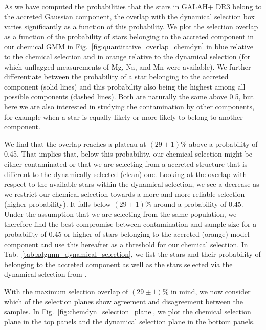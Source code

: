 \documentclass[fleqn,usenatbib]{mnras}
\begin{document}

As we have computed the probabilities that the stars in GALAH+ DR3 belong to the accreted Gaussian component, the overlap with the dynamical selection box varies significantly as a function of this probability. We plot the selection overlap as a function of the probability of stars belonging to the accreted component in our chemical GMM in Fig.~\ref{fig:quantitative_overlap_chemdyn} in blue relative to the chemical selection and in orange relative to the dynamical selection (for which unflagged measurements of Mg, Na, and Mn were available). We further differentiate between the probability of a star belonging to the accreted component (solid lines) and this probability also being the highest among all possible components (dashed lines). Both are naturally the same above 0.5, but here we are also interested in studying the contamination by other components, for example when a star is equally likely or more likely to belong to another component. 

We find that the overlap reaches a plateau at $(29\pm1)\%$ above a probability of 0.45. That implies that, below this probability, our chemical selection might be either contaminated or that we are selecting from a accreted structure that is different to the dynamically selected (clean) one. Looking at the overlap with respect to the available stars within the dynamical selection, we see a decrease as we restrict our chemical selection towards a more and more reliable selection (higher probability). It falls below $(29\pm1)\%$ around a probability of 0.45. Under the assumption that we are selecting from the same population, we therefore find the best compromise between contamination and sample size for a probability of 0.45 or higher of stars belonging to the accreted (orange) model component and use this hereafter as a threshold for our chemical selection. In Tab.~\ref{tab:xdgmm_dynamical_selection}, we list the stars and their probability of belonging to the accreted component as well as the stars selected via the dynamical selection from \citet{Feuillet2021}.


With the maximum selection overlap of $(29\pm1)\%$ in mind, we now consider which of the selection planes show agreement and disagreement between the samples. In Fig.~\ref{fig:chemdyn_selection_plane}, we plot the chemical selection plane in the top panels and the dynamical selection plane in the bottom panels.
\end{document}
